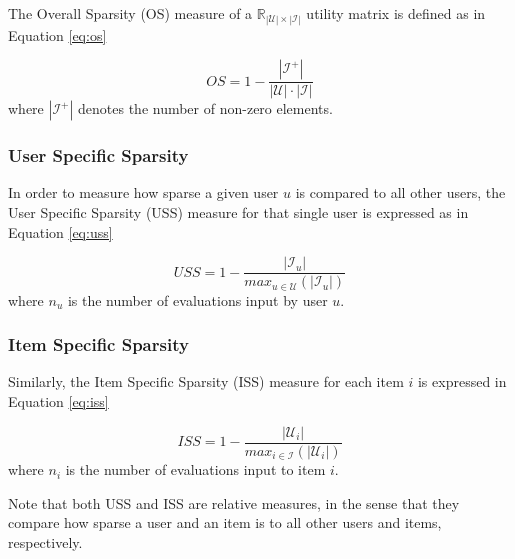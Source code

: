 		The Overall Sparsity (OS)  measure of a $\mathbb{R}_{|\mathcal{U}| \times |\mathcal{I}|}$ utility matrix is defined as in Equation \ref{eq:os}
	
		\begin{equation}
			\label{eq:os}
			OS = 1 - \frac{|\mathcal{I}^+|}{|\mathcal{U}| \cdot |\mathcal{I}|}	 
		\end{equation} where $|\mathcal{I}^+|$ denotes the number of non-zero elements. 

	\subsubsection{User Specific Sparsity}
	
	In order to measure how sparse a given user $u$ is compared to all other users, the User Specific Sparsity (USS)  measure for that single user is expressed as in Equation  \ref{eq:uss}

	\begin{equation}
		\label{eq:uss}
		USS = 1 - \frac{|\mathcal{I}_u|}{max_{u \in \mathcal{U}} (|\mathcal{I}_u|)}
	\end{equation} where $n_u$ is the number of evaluations input by user $u$. 
	
	\subsubsection{Item Specific Sparsity}
	
	Similarly, the Item Specific Sparsity (ISS)  measure for each item $i$ is expressed in Equation \ref{eq:iss}
	
	\begin{equation}
	    \label{eq:iss}
	    ISS = 1 - \frac{|\mathcal{U}_i|}{max_{i \in \mathcal{I}} (|\mathcal{U}_i|)}
	\end{equation} where $n_i$ is the number of evaluations input to item $i$.
	
	Note that both USS and ISS are relative measures, in the sense that they compare how sparse a user and an item is to all other users and items, respectively.
	

